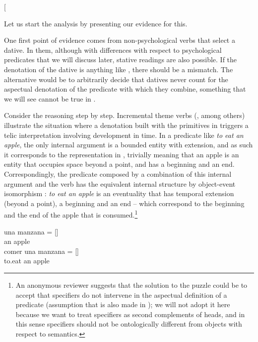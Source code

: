 \documentclass[output=paper,colorlinks,citecolor=brown,nonflat]{langsci/langscibook}
\begin{document}
\ea%
    \label{ex:fabregas:17}{}
    [
    \z

Let us start the analysis by presenting our evidence for this. 


One first point of evidence comes from non-psychological verbs that select a dative. In them, although with differences with respect to psychological predicates that we will discuss later, stative readings are also possible. If the denotation of the dative is anything like , there should be a mismatch. The alternative would be to arbitrarily decide that datives never count for the aspectual denotation of the predicate with which they combine, something that we will see cannot be true in .

Consider the reasoning step by step. Incremental theme verbs (\citealt{Tenny1987, Krifka1989}, among others) illustrate the situation where a denotation built with the primitives in  triggers a telic interpretation involving development in time. In a predicate like \textit{to eat an apple}, the only internal argument is a bounded entity with extension, and as such it corresponds to the representation in , trivially meaning that an apple is an entity that occupies space beyond a point, and has a beginning and an end. Correspondingly, the predicate  composed by a combination of this internal argument and the verb has the equivalent internal structure by object-event isomorphism \citep{Ramchand2008}: \textit{to eat an apple} is an eventuality that has temporal extension (beyond a point), a beginning and an end – which correspond to the beginning and the end of the apple that is consumed.\footnote{An anonymous reviewer suggests that the solution to the puzzle could be to accept that specifiers do not intervene in the aspectual definition of a predicate (assumption that is also made in \citealt{Ramchand2008}); we will not adopt it here because we want to treat specifiers as second complements of heads, and in this sense specifiers should not be ontologically different from objects with respect to semantics.} 

\ea%
    \label{ex:fabregas:18}
    \ea\label{ex:fabregas:18a}
    \gll    una manzana       =       [{\midline}]\\
            {an}   {apple}\\
    \ex\label{ex:fabregas:18b}
    \gll    comer una manzana  =      [{\midline}]\\
            {to.eat}  {an}   {apple}\\
    \z
\z
\end{document}
